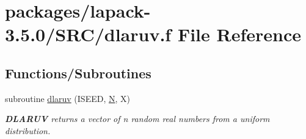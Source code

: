 \hypertarget{dlaruv_8f}{}\section{packages/lapack-\/3.5.0/\+S\+R\+C/dlaruv.f File Reference}
\label{dlaruv_8f}
\subsection*{Functions/\+Subroutines}
\begin{DoxyCompactItemize}
\item 
subroutine \hyperlink{group__auxOTHERauxiliary_ga55e7c02e398f2c6365c956d272836a89}{dlaruv} (I\+S\+E\+E\+D, \hyperlink{polmisc_8c_a0240ac851181b84ac374872dc5434ee4}{N}, X)
\begin{DoxyCompactList}\small\item\em {\bfseries D\+L\+A\+R\+U\+V} returns a vector of n random real numbers from a uniform distribution. \end{DoxyCompactList}\end{DoxyCompactItemize}
